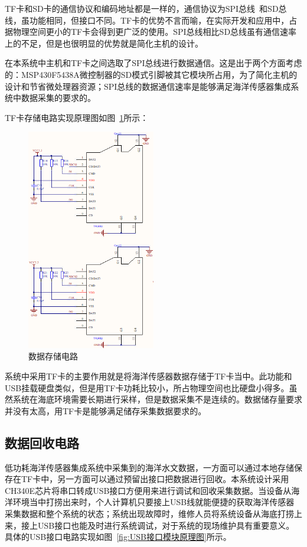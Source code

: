 TF卡和SD卡的通信协议和编码地址都是一样的，通信协议为SPI总线~\cite{2015zjh}和SD总线，虽功能相同，但接口不同。TF卡的优势不言而喻，在实际开发和应用中，占据物理空间更小的TF卡会得到更广泛的使用。SPI总线相比SD总线虽有通信速率上的不足，但是也很明显的优势就是简化主机的设计。

在本系统中主机和TF卡之间选取了SPI总线进行数据通信。这是出于两个方面考虑的：MSP430F5438A微控制器的SD模式引脚被其它模块所占用，为了简化主机的设计和节省微处理器资源；SPI总线的数据通信速率是能够满足海洋传感器集成系统中数据采集的要求的。

TF卡存储电路实现原理图如图~\ref{fig:TF卡电路}所示：

\begin{figure}[ht]
    \centering
	\includegraphics[width=0.5\textwidth]{fig/TF卡电路.png}
	\caption{数据存储电路}
	\label{fig:TF卡电路}
\end{figure}

系统中采用TF卡的主要作用就是将海洋传感器数据存储于TF卡当中。此功能和USB挂载硬盘类似，但是用TF卡功耗比较小，所占物理空间也比硬盘小得多。虽然系统在海底环境需要长期进行采样，但是数据采集不是连续的。数据储存量要求并没有太高，用TF卡是能够满足储存采集数据要求的。
\subsection{数据回收电路}
低功耗海洋传感器集成系统中采集到的海洋水文数据，一方面可以通过本地存储保存在TF卡中，另一方面可以通过预留出接口把数据进行回收。本系统设计采用CH340E芯片将串口转成USB接口方便用来进行调试和回收采集数据。当设备从海洋环境当中打捞出来时，个人计算机只要接上USB线就能便捷的获取海洋传感器采集数据和整个系统的状态；系统出现故障时，维修人员将系统设备从海底打捞上来，接上USB接口也能及时进行系统调试，对于系统的现场维护具有重要意义。具体的USB接口电路实现如图~\ref{fig:USB接口模块原理图}所示。

